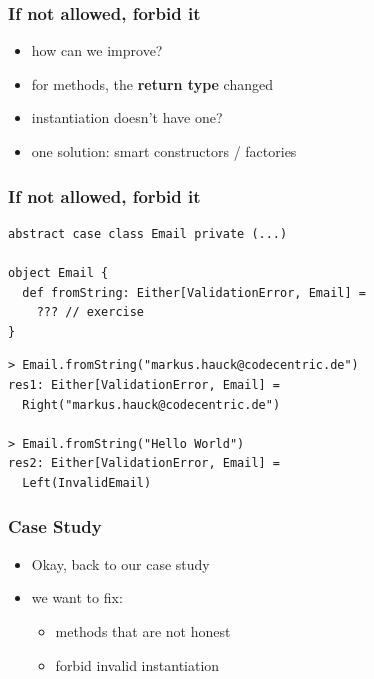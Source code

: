 \documentclass{beamer}
\begin{document}
\begin{frame}
  \frametitle{If not allowed, forbid it}
  \begin{itemize}
  \item how can we improve?
  \item for methods, the \textbf{return type} changed
  \item instantiation doesn't have one?
  \item one solution: smart constructors / factories
  \end{itemize}
\end{frame}

\begin{frame}
  \frametitle{If not allowed, forbid it}
\begin{verbatim}
abstract case class Email private (...)

object Email {
  def fromString: Either[ValidationError, Email] = 
    ??? // exercise
}
\end{verbatim}

\begin{verbatim}
> Email.fromString("markus.hauck@codecentric.de")
res1: Either[ValidationError, Email] = 
  Right("markus.hauck@codecentric.de")

> Email.fromString("Hello World")
res2: Either[ValidationError, Email] = 
  Left(InvalidEmail)
\end{verbatim}
\end{frame}

\begin{frame}
  \frametitle{Case Study}
  \begin{itemize}
  \item Okay, back to our case study
  \item we want to fix:
    \begin{itemize}
    \item methods that are not honest
    \item forbid invalid instantiation
    \end{itemize}
  \end{itemize}
\end{frame}

\begin{frame}[fragile,c]
  
  \inputminted[fontsize=\small, firstline=3, lastline=22]{scala}{../src/main/scala/de/codecentric/two/VendingMachine.scala}
\end{frame}

\begin{frame}[fragile,c]
  \inputminted[fontsize=\small, firstline=24, lastline=33]{scala}{../src/main/scala/de/codecentric/two/VendingMachine.scala}
\end{frame}
\end{document}
